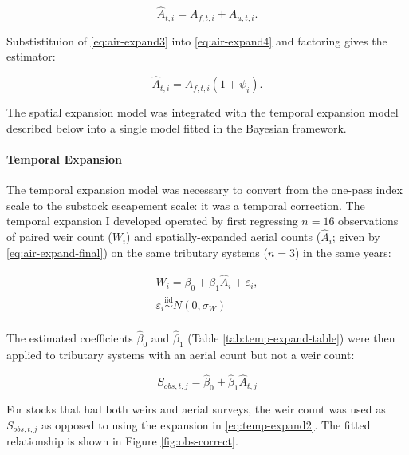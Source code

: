 \documentclass[12pt,]{book}
\let\oldparagraph\paragraph
\renewcommand{\paragraph}[1]{\oldparagraph{#1}\mbox{}}
\theoremstyle{definition}
\theoremstyle{definition}
\theoremstyle{definition}
\theoremstyle{remark}
\begin{document}
\begin{equation}
  \hat{A}_{t,i} = A_{f,t,i} + A_{u,t,i}.
  \label{eq:air-expand4}
\end{equation}

\noindent
Substistituion of \eqref{eq:air-expand3} into \eqref{eq:air-expand4} and
factoring gives the estimator:

\begin{equation}
  \hat{A}_{t,i}=A_{f,t,i}(1 + \psi_i).
  \label{eq:air-expand-final}
\end{equation}

\noindent
The spatial expansion model was integrated with the temporal expansion
model described below into a single model fitted in the Bayesian
framework.

\paragraph{Temporal Expansion}\label{temp-expansion}

\noindent
The temporal expansion model was necessary to convert from the one-pass
index scale to the substock escapement scale: it was a temporal
correction. The temporal expansion I developed operated by first
regressing \(n = 16\) observations of paired weir count (\(W_i\)) and
spatially-expanded aerial counts (\(\hat{A}_{i}\); given by
\eqref{eq:air-expand-final}) on the same tributary systems (\(n = 3\)) in
the same years:

\begin{equation}
  \begin{split}
    W_i = \beta_0 + \beta_1 \hat{A}_i + \varepsilon_i, \\
    \varepsilon_i \stackrel{\text{iid}}{\sim} N(0, \sigma_W) \\
  \end{split}
\label{eq:temp-expand1}
\end{equation}

The estimated coefficients \(\hat{\beta}_0\) and \(\hat{\beta}_1\)
(Table \ref{tab:temp-expand-table}) were then applied to tributary
systems with an aerial count but not a weir count:

\begin{equation}
  S_{obs,t,j}=\hat{\beta}_0 + \hat{\beta}_1 \hat{A}_{t,j}
\label{eq:temp-expand2}
\end{equation}

\noindent
For stocks that had both weirs and aerial surveys, the weir count was
used as \(S_{obs,t,j}\) as opposed to using the expansion in
\eqref{eq:temp-expand2}. The fitted relationship is shown in Figure
\ref{fig:obs-correct}.
\end{document}
